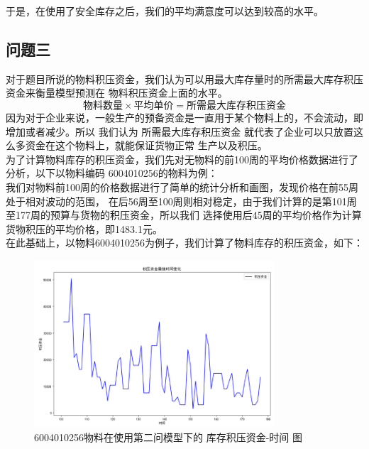 \documentclass{cumcmthesis}
\begin{document}
        于是，在使用了安全库存之后，我们的平均满意度可以达到较高的水平。

        \subsection{问题三}

        对于题目所说的物料积压资金，我们认为可以用最大库存量时的所需最大库存积压资金来衡量模型预测在
        物料积压资金上面的水平。\\
        \begin{equation}
            \text{物料数量} \times \text{平均单价} = \text{所需最大库存积压资金}
        \end{equation}
        因为对于企业来说，一般生产的预备资金是一直用于某个物料上的，不会流动，即增加或者减少。所以
        我们认为 所需最大库存积压资金 就代表了企业可以只放置这么多资金在这个物料上，就能保证货物正常
        生产以及积压。\\
        为了计算物料库存的积压资金，我们先对无物料的前100周的平均价格数据进行了分析，以下以物料编码
        6004010256的物料为例：\\
        我们对物料前100周的价格数据进行了简单的统计分析和画图，发现价格在前55周处于相对波动的范围，
        在后56周至100周则相对稳定，由于我们计算的是第101周至177周的预算与货物的积压资金，所以我们
        选择使用后45周的平均价格作为计算货物积压的平均价格，即1483.1元。\\
        在此基础上，以物料6004010256为例子，我们计算了物料库存的积压资金，如下：\\

        \begin{figure}[ht!]
            \centering
            \includegraphics[width=0.8\textwidth]{graph/graph_17.png}
            \caption{6004010256物料在使用第二问模型下的 库存积压资金-时间 图}
            \label{fig:17}
        \end{figure}
\end{document}
